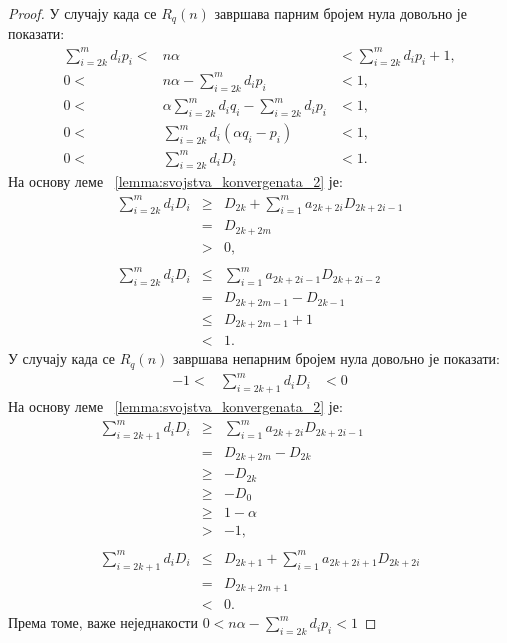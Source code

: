 \documentclass[a4paper]{article}
\begin{document}
\begin{proof}
	У случају када се $ R_q(n) $ завршава парним бројем нула довољно је показати:	
	\begin{eqnarray*}
		\sum_{i = 2k}^{m} d_{i}p_{i} <& n\alpha &< \sum_{i = 2k}^{m} d_{i}p_{i} + 1,\\
		0 <& n\alpha - \sum_{i = 2k}^{m} d_{i}p_{i} &< 1,\\
		0 <& \alpha \sum_{i = 2k}^{m} d_{i}q_{i} - \sum_{i = 2k}^{m} d_{i}p_{i} &< 1,\\
		0 <& \sum_{i = 2k}^{m} d_{i}(\alpha q_{i} - p_{i}) &< 1,\\
		0 <& \sum_{i = 2k}^{m} d_{i}D_{i} &< 1.
	\end{eqnarray*}	
	На основу леме ~\ref{lemma:svojstva_konvergenata_2} је:
	\begin{eqnarray*}
		\sum_{i = 2k}^{m} d_{i}D_{i} &\geq& D_{2k} + \sum_{i=1}^{m}a_{2k+2i}D_{2k+2i-1}\\ 
		&=& D_{2k+2m}\\ 
		&>& 0,\\\\
		\sum_{i = 2k}^{m} d_{i}D_{i} &\leq& \sum_{i=1}^{m}a_{2k+2i-1}D_{2k+2i-2}\\ 
		&=& D_{2k+2m-1} - D_{2k-1}\\ 
		&\leq& D_{2k+2m-1} + 1\\ 
		&<& 1.
	\end{eqnarray*}
	У случају када се $ R_q(n) $ завршава непарним бројем нула довољно је показати:
	\begin{eqnarray*}
		-1 <& \sum_{i = 2k+1}^{m} d_{i}D_{i} &< 0
	\end{eqnarray*}
	На основу леме ~\ref{lemma:svojstva_konvergenata_2} је:	
	\begin{eqnarray*}
		\sum_{i = 2k+1}^{m} d_{i}D_{i} &\geq& \sum_{i=1}^{m}a_{2k+2i}D_{2k+2i-1}\\ 
		&=& D_{2k+2m} - D_{2k}\\ 
		&\geq& - D_{2k}\\
		&\geq& - D_{0}\\
		&\geq& 1-\alpha\\
		&>& -1,\\\\
		\sum_{i = 2k+1}^{m} d_{i}D_{i} &\leq& D_{2k+1} + \sum_{i=1}^{m}a_{2k+2i+1}D_{2k+2i}\\ 
		&=& D_{2k+2m+1}\\ 
		&<& 0.
	\end{eqnarray*}
	Према томе, важе неједнакости $ 0 < n\alpha - \sum_{i = 2k}^{m} d_{i}p_{i} < 1 $
\end{proof}
\end{document}
